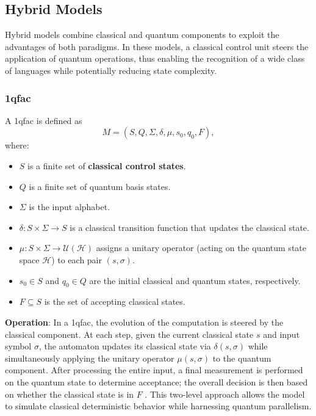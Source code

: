 \subsection{Hybrid Models}
\label{subsec:hybrid-models}

Hybrid models combine classical and quantum components to exploit the advantages of both paradigms. In these models, a classical control unit steers the application of quantum operations, thus enabling the recognition of a wide class of languages while potentially reducing state complexity.

\subsubsection{\acrfull{1qfac}}
\label{sssec:1qfac}
\begin{definition}
A \gls{1qfac} is defined as 
\[
M = (S, Q, \Sigma, \delta, \mu, s_0, q_0, F),
\]
where:
\begin{itemize}
    \item \( S \) is a finite set of \textbf{classical control states}.
    \item \( Q \) is a finite set of quantum basis states.
    \item \( \Sigma \) is the input alphabet.
    \item \(\delta: S \times \Sigma \to S\) is a classical transition function that updates the classical state.
    \item \(\mu: S \times \Sigma \to \mathcal{U}(\mathcal{H})\) assigns a unitary operator (acting on the quantum state space \(\mathcal{H}\)) to each pair \((s,\sigma)\).
    \item \( s_0 \in S \) and \( q_0 \in Q \) are the initial classical and quantum states, respectively.
    \item \( F \subseteq S \) is the set of accepting classical states.
\end{itemize}
\end{definition}

\textbf{Operation}:  
In a \gls{1qfac}, the evolution of the computation is steered by the classical component. At each step, given the current classical state \( s \) and input symbol \( \sigma \), the automaton updates its classical state via \(\delta(s,\sigma)\) while simultaneously applying the unitary operator \(\mu(s,\sigma)\) to the quantum component. After processing the entire input, a final measurement is performed on the quantum state to determine acceptance; the overall decision is then based on whether the classical state is in \( F \) \cite{zheng2012one}. This two-level approach allows the model to simulate classical deterministic behavior while harnessing quantum parallelism.

